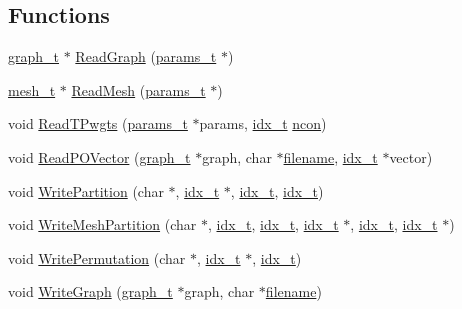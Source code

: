 \subsection*{Functions}
\begin{DoxyCompactItemize}
\item 
\hyperlink{a00734}{graph\+\_\+t} $\ast$ \hyperlink{a00948_ac8fe4a21ae3e0e01afdba3fedf1c6123}{Read\+Graph} (\hyperlink{a00706}{params\+\_\+t} $\ast$)
\item 
\hyperlink{a00738}{mesh\+\_\+t} $\ast$ \hyperlink{a00948_aef01a8b2c6432d21be77abeabeeeced8}{Read\+Mesh} (\hyperlink{a00706}{params\+\_\+t} $\ast$)
\item 
void \hyperlink{a00948_a12b940ccee061b8787088fbe16245f46}{Read\+T\+Pwgts} (\hyperlink{a00706}{params\+\_\+t} $\ast$params, \hyperlink{a00876_aaa5262be3e700770163401acb0150f52}{idx\+\_\+t} \hyperlink{a00879_ac1dd31740e8f97fb57dc917ded30253f}{ncon})
\item 
void \hyperlink{a00948_a65a7c382444e5132dafddb75b6117754}{Read\+P\+O\+Vector} (\hyperlink{a00734}{graph\+\_\+t} $\ast$graph, char $\ast$\hyperlink{a00623_a42a21beb8018ac623f4d09db1343b9cf}{filename}, \hyperlink{a00876_aaa5262be3e700770163401acb0150f52}{idx\+\_\+t} $\ast$vector)
\item 
void \hyperlink{a00948_ad05062397a736c5602a72c2419deffbf}{Write\+Partition} (char $\ast$, \hyperlink{a00876_aaa5262be3e700770163401acb0150f52}{idx\+\_\+t} $\ast$, \hyperlink{a00876_aaa5262be3e700770163401acb0150f52}{idx\+\_\+t}, \hyperlink{a00876_aaa5262be3e700770163401acb0150f52}{idx\+\_\+t})
\item 
void \hyperlink{a00948_ac8ce682e47fbcfad378ee4100ab091ca}{Write\+Mesh\+Partition} (char $\ast$, \hyperlink{a00876_aaa5262be3e700770163401acb0150f52}{idx\+\_\+t}, \hyperlink{a00876_aaa5262be3e700770163401acb0150f52}{idx\+\_\+t}, \hyperlink{a00876_aaa5262be3e700770163401acb0150f52}{idx\+\_\+t} $\ast$, \hyperlink{a00876_aaa5262be3e700770163401acb0150f52}{idx\+\_\+t}, \hyperlink{a00876_aaa5262be3e700770163401acb0150f52}{idx\+\_\+t} $\ast$)
\item 
void \hyperlink{a00948_a1c37c9f8d06b4dea85ac0ab2abe762eb}{Write\+Permutation} (char $\ast$, \hyperlink{a00876_aaa5262be3e700770163401acb0150f52}{idx\+\_\+t} $\ast$, \hyperlink{a00876_aaa5262be3e700770163401acb0150f52}{idx\+\_\+t})
\item 
void \hyperlink{a00948_a91b3b24f2b508da8f2e2df7bc2c94cc6}{Write\+Graph} (\hyperlink{a00734}{graph\+\_\+t} $\ast$graph, char $\ast$\hyperlink{a00623_a42a21beb8018ac623f4d09db1343b9cf}{filename})

\end{DoxyCompactItemize}
